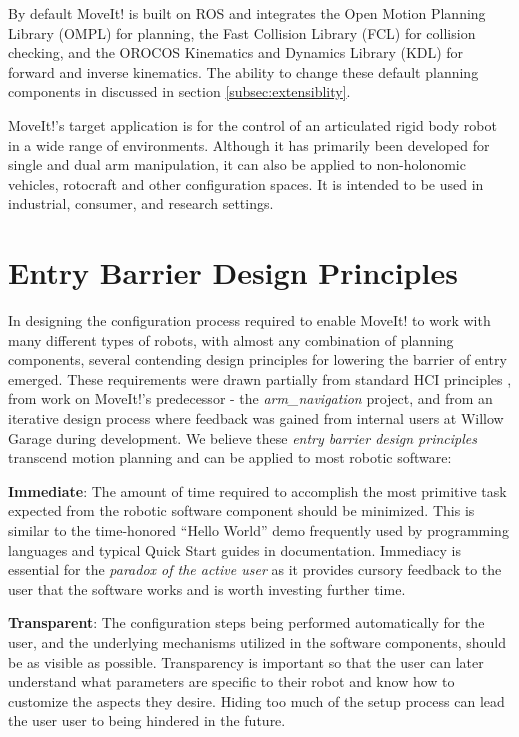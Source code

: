 \documentclass[10pt,journal,compsoc]{joser1}
\begin{document}
{By default MoveIt! is built on ROS and integrates the Open Motion Planning Library (OMPL) for planning, the Fast Collision Library (FCL) \cite{fcl} for collision checking, and the OROCOS Kinematics and Dynamics Library (KDL) \cite{kdl} for forward and inverse kinematics. The ability to change these default planning components in discussed in section \ref{subsec:extensiblity}.

MoveIt!'s target application is for the control of an articulated rigid body robot in a wide range of environments. Although it has primarily been developed for single and dual arm manipulation, it can also be applied to non-holonomic vehicles, rotocraft and other configuration spaces. It is intended to be used in industrial, consumer, and research settings.

\section{Entry Barrier Design Principles}
\label{sec::requirements}

In designing the configuration process required to enable MoveIt! to work with many different types of robots, with almost any combination of planning components, several contending design principles for lowering the barrier of entry emerged. These requirements were drawn partially from standard HCI principles \cite{galitz2007essential}, from work on MoveIt!'s predecessor - the \textit{arm\_navigation} project, and from an iterative design process where feedback was gained from internal users at Willow Garage during development. We believe these \textit{entry barrier design principles} transcend motion planning and can be applied to most robotic software:

{\bf Immediate}: The amount of time required to accomplish the most primitive task expected from the robotic software component should be minimized. This is similar to the time-honored ``Hello World'' demo frequently used by programming languages and typical Quick Start guides in documentation. Immediacy is essential for the \textit{paradox of the active user} as it provides cursory feedback to the user that the software works and is worth investing further time.

{\bf Transparent}: The configuration steps being performed automatically for the user, and the underlying mechanisms utilized in the software components, should be as visible as possible. Transparency is important so that the user can later understand what parameters are specific to their robot and know how to customize the aspects they desire. Hiding too much of the setup process can lead the user user to being hindered in the future.

}
\end{document}
